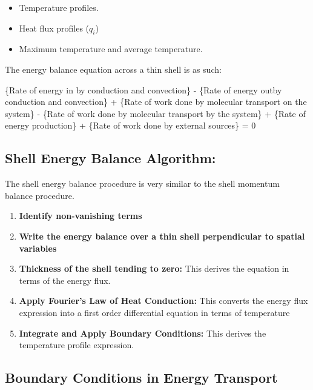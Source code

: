 \begin{itemize}

    \item Temperature profiles.

    \item Heat flux profiles ($q_{i}$)

    \item Maximum temperature and average temperature.

\end{itemize}


The energy balance equation across a thin shell is as such:

\{Rate of energy in by conduction and convection\} - \{Rate of energy outby conduction and convection\} + \{Rate of work done by molecular transport on the system\} - \{Rate of work done by molecular transport by the system\} + \{Rate of energy production\} + \{Rate of work done by external sources\} = 0

\subsection{Shell Energy Balance Algorithm:}

The shell energy balance procedure is very similar to the shell momentum balance procedure.

\begin{enumerate}

    \item \textbf{Identify non-vanishing terms} 
    
    \item \textbf{Write the energy balance over a thin shell perpendicular to spatial variables}

\item \textbf{Thickness of the shell tending to zero:} This derives the equation in terms of the energy flux.

    \item \textbf{Apply Fourier's Law of Heat Conduction:} This converts the energy flux expression into a first order differential equation in terms of temperature

    \item \textbf{Integrate and Apply Boundary Conditions:} This derives the temperature profile expression.


\end{enumerate}

\subsection{Boundary Conditions in Energy Transport}

